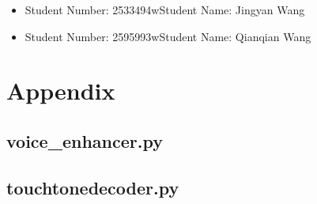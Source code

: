 \documentclass[a4paper,12pt]{article}
\begin{document}
\begin{itemize}
	\item Student Number: 2533494w\space Student Name: Jingyan Wang
	\item Student Number: 2595993w\space Student Name: Qianqian Wang
\end{itemize}

\clearpage
\section{Appendix}

\subsection{voice\_enhancer.py}

\subsection{touchtonedecoder.py}

\end{document}
